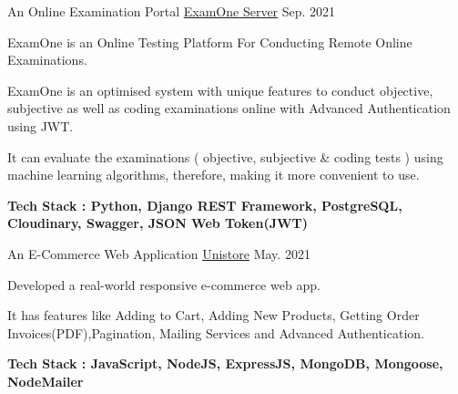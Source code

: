 


\begin{cventries}

  \cventry
    {An Online Examination Portal} %
    {\href{https://github.com/phoenix-1-2/ExamOne-Server}{ExamOne Server}} %
    {}
    {Sep. 2021} %
    {
      \begin{cvitems} %
        \item {ExamOne is an Online Testing Platform For Conducting Remote Online Examinations.}
        \item {ExamOne is an optimised system with unique features to conduct objective, subjective as well as coding examinations online with Advanced Authentication using JWT.}
        \item {It can evaluate the examinations ( objective, subjective \& coding tests ) using machine learning algorithms, therefore, making it more convenient to use.}
        \item {\textbf{Tech Stack : Python, Django REST Framework, PostgreSQL, Cloudinary, Swagger, JSON Web Token(JWT) }}
      \end{cvitems}
    }

  \cventry
    {An E-Commerce Web Application} %
    {\href{https://unistore-12.herokuapp.com/}{Unistore}} %
    {} %
    {May. 2021} %
    {
      \begin{cvitems} %
        \item {Developed a real-world responsive e-commerce web app.}
        \item {It has features like Adding to Cart, Adding New Products, Getting Order Invoices(PDF),Pagination, Mailing Services and Advanced Authentication.}
        \item {\textbf{Tech Stack : JavaScript, NodeJS, ExpressJS, MongoDB, Mongoose, NodeMailer}}
      \end{cvitems}
    }


\end{cventries}

